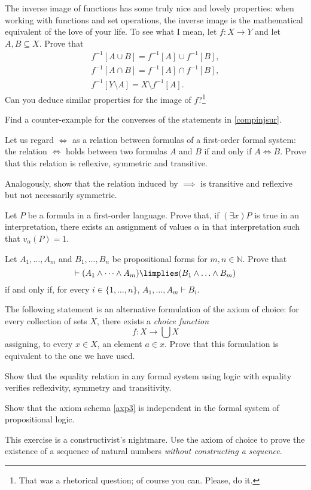 

\begin{exercises}

\item The inverse image of functions has some truly nice and lovely properties: when working with functions and set operations, the inverse image is the mathematical equivalent of the love of your life. To see what I mean, let $f:X\longrightarrow Y$ and let $A,B\subseteq X$. Prove that
\begin{gather*}
f^{-1}[A\cup B] = f^{-1}[A] \cup f^{-1}[B],\\
f^{-1}[A\cap B] = f^{-1}[A] \cap f^{-1}[B],\\
f^{-1}[Y\setminus A] = X\setminus f^{-1}[A].
\end{gather*}
Can you deduce similar properties for the image of $f$?\footnote{That was a rhetorical question; of course you can. Please, do it.}


\item Find a counter-example for the converses of the statements in \ref{compinjsur}.

\item Let us regard $\iff$ as a relation between formulas of a first-order formal system: the relation $\iff$ holds between two formulas $A$ and $B$ if and only if $A\iff B$.
Prove that this relation is reflexive, symmetric and transitive.

Analogously, show that the relation induced by $\implies $ is transitive and reflexive but not necessarily symmetric.


\item Let $P$ be a formula in a first-order language.
Prove that, if $(\exists x) P$ is true in an interpretation, there exists an assignment of values $\alpha$ in that interpretation such that $v_\alpha(P) = 1$.

\item Let $A_1,\ldots,A_m$ and $B_1,\ldots,B_n$ be propositional forms for $m,n\in\mathbb{N}$. Prove that
\[ \vdash (A_1\land \cdots \land A_m) \limplies (B_1\land \ldots \land B_m)\]
if and only if, for every $i\in \{1,\ldots,n\}$, $A_1,\ldots,A_m\vdash B_i$.

\item The following statement is an alternative formulation of the axiom of choice: for every collection of sets $X$, there exists a \emph{choice function}
\[f: X\longrightarrow \bigcup X\]
assigning, to every $x\in X$, an element $a\in x$. Prove that this formulation is equivalent to the one we have used.

\item Show that the equality relation in any formal system using logic with equality verifies reflexivity, symmetry and transitivity.

\item Show that the axiom schema \ref{axp3} is independent in the formal system of propositional logic.

\item This exercise is a constructivist's nightmare.
Use the axiom of choice to prove the existence of a sequence of natural numbers \emph{without constructing a sequence}.
\end{exercises}
